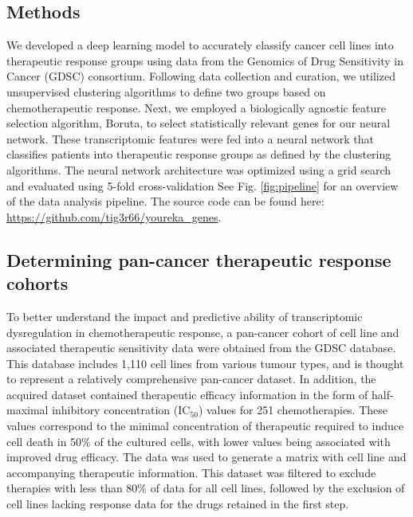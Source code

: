 \documentclass[10pt, letterpaper]{article}
\begin{document}
\begin{multicols*}{2}
\section{Methods}

We developed a deep learning model to accurately classify cancer cell lines into therapeutic response groups using data from the Genomics of Drug Sensitivity in Cancer (GDSC) consortium. Following data collection and curation, we utilized unsupervised clustering algorithms to define two groups based on chemotherapeutic response. Next, we employed a biologically agnostic feature selection algorithm, Boruta, to select statistically relevant genes for our neural network. These transcriptomic features were fed into a neural network that classifies patients into therapeutic response groups as defined by the clustering algorithms. The neural network architecture was optimized using a grid search and evaluated using 5-fold cross-validation See Fig. \ref{fig:pipeline} for an overview of the data analysis pipeline. The source code can be found here: \url{https://github.com/tig3r66/youreka_genes}.


\subsection{Determining pan-cancer therapeutic response cohorts}
To better understand the impact and predictive ability of transcriptomic dysregulation in chemotherapeutic response, a pan-cancer cohort of cell line and associated therapeutic sensitivity data were obtained from the GDSC database. This database includes 1,110 cell lines from various tumour types, and is thought to represent a relatively comprehensive pan-cancer dataset. In addition, the acquired dataset contained therapeutic efficacy information in the form of half-maximal inhibitory concentration (IC$_{50}$) values for 251 chemotherapies. These values correspond to the minimal concentration of therapeutic required to induce cell death in 50\% of the cultured cells, with lower values being associated with improved drug efficacy. The data was used to generate a matrix with cell line and accompanying therapeutic information. This dataset was filtered to exclude therapies with less than 80\% of data for all cell lines, followed by the exclusion of cell lines lacking response data for the drugs retained in the first step.



\end{multicols*}
\end{document}
